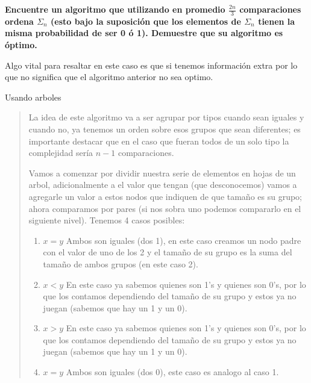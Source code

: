 \textbf{Encuentre un algoritmo que utilizando en promedio $\frac{2n}{3}$ comparaciones ordena $\Sigma_n$ (esto bajo la suposición que los elementos de $\Sigma_n$ tienen la misma probabilidad de ser 0 ó 1). Demuestre que su algoritmo es óptimo.}\vspace{.2cm}

Algo vital para resaltar en este caso es que si tenemos información extra por lo que no significa que el algoritmo anterior no sea optimo. \vspace{.2cm}

\textcolor{bibi}{Usando arboles}
\begin{quote}
    La idea de este algoritmo va a ser agrupar por tipos cuando sean iguales y cuando no, ya tenemos un orden sobre esos grupos que sean diferentes; es importante destacar que en el caso que fueran todos de un solo tipo la complejidad sería $n - 1$ comparaciones. \vspace{.2cm}

    Vamos a comenzar por dividir nuestra serie de elementos en hojas de un arbol, adicionalmente a el valor que tengan (que desconocemos) vamos a agregarle un valor a estos nodos que indiquen de que tamaño es su grupo; ahora comparamos por pares (si nos sobra uno podemos compararlo en el siguiente nivel). Tenemos 4 casos posibles: \vspace{.2cm}

    \begin{enumerate}
        \item \textbf{$x=y$} Ambos son iguales (dos 1), en este caso creamos un nodo padre con el valor de uno de los 2 y el tamaño de su grupo es la suma del tamaño de ambos grupos (en este caso 2). \vspace{.1cm}
        \item \textbf{$x<y$} En este caso ya sabemos quienes son 1's y quienes son 0's, por lo que los contamos dependiendo del tamaño de su grupo y estos ya no juegan (sabemos que hay un 1 y un 0). \vspace{.1cm}
        \item \textbf{$x>y$} En este caso ya sabemos quienes son 1's y quienes son 0's, por lo que los contamos dependiendo del tamaño de su grupo y estos ya no juegan (sabemos que hay un 1 y un 0). \vspace{.1cm}
        \item \textbf{$x=y$} Ambos son iguales (dos 0), este caso es analogo al caso 1. \vspace{.2cm}
    \end{enumerate}


\end{quote}
